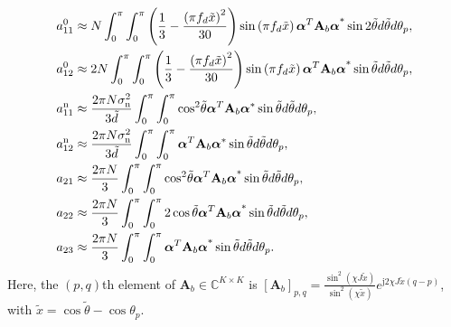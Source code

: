 \documentclass[12pt, draftclsnofoot, onecolumn]{IEEEtran}
\begin{document}
\begin{align}
a_{11}^{0} & \approx N \int_{0}^{ \rm{\pi} }\int_{0}^{ \rm{\pi} }\left( \frac{1}{3}-\frac{{{\left( { \rm{\pi} } {{f}_{d}}\tilde{x} \right)}^{2}}}{30} \right) \sin \left( { \rm{\pi} }{{f}_{d}}\tilde{x} \right){{\boldsymbol{\alpha }}^{T}}{{\mathbf{A}}_{b}}{{\boldsymbol{\alpha }}^{\text{*}}}\sin 2\tilde{\theta }d\tilde{\theta }d{{\theta }_{p}}, \\ \label{a110}
a_{12}^{0} & \approx 2N \int_{0}^{ \rm{\pi} }\int_{0}^{ \rm{\pi} }\left( \frac{1}{3}-\frac{{{\left( { \rm{\pi} } {{f}_{d}}\tilde{x} \right)}^{2}}}{30} \right) \sin \left( { \rm{\pi} }{{f}_{d}}\tilde{x} \right){{\boldsymbol{\alpha }}^{T}}{{\mathbf{A}}_{b}}{{\boldsymbol{\alpha }}^{\text{*}}}\sin \tilde{\theta }d\tilde{\theta }d{{\theta }_{p}}, \\ \label{a120}
a_{11}^{\mathrm{n}} & \approx \frac{2{\rm{\pi}}N \sigma_{\mathrm{n}}^{2}} {3\tilde{d}} \int_{0}^{ \rm{\pi} } {\int_{0}^{ \rm{\pi} } {{{\cos }^{2}}\tilde{\theta } {{\boldsymbol{\alpha }}^{T}} {{\mathbf{A}}_{b}}{{\boldsymbol{\alpha }}^{*}}\sin \tilde{\theta } d\tilde{\theta }}d{{\theta }_{p}}}, \\ \label{a11n}
a_{12}^{\mathrm{n}} & \approx \frac{2{\rm{\pi}}N \sigma_{\mathrm{n}}^{2}}{3\tilde{d}} \int_{0}^{ \rm{\pi} }{\int_{0}^{ \rm{\pi} } {{{\boldsymbol{\alpha }}^{T}}{{\mathbf{A}}_{b}} {{\boldsymbol{\alpha }}^{*}}\sin \tilde{\theta } d\tilde{\theta }}d{{\theta }_{p}}}, \\ \label{a12n} %
{{a}_{21}} & \approx \frac{2{\rm{\pi}}N}{3} \int_{0}^{ \rm{\pi} } {\int_{0}^{ \rm{\pi} }{{{\cos }^{2}} \tilde{\theta }{{\boldsymbol{\alpha }}^{T}} {{\mathbf{A}}_{b}} {{\boldsymbol{\alpha }}^{\text{*}}}\sin \tilde{\theta }d\tilde{\theta }} d{{\theta }_{p}}}, \\ \label{a21}
{{a}_{22}}& \approx \frac{2{\rm{\pi}}N}{3} \int_{0}^{ \rm{\pi} } \int_{0}^{ \rm{\pi} }{2\cos \tilde{\theta } {{\boldsymbol{\alpha }}^{T}} {{\mathbf{A}}_{b}} {{\boldsymbol{\alpha }}^{\text{*}}}\sin \tilde{\theta }d\tilde{\theta }} d{{\theta }_{p}}, \\ \label{a22}
{{a}_{23}} & \approx \frac{2{\rm{\pi}}N}{3} \int_{0}^{ \rm{\pi} } \int_{0}^{ \rm{\pi} }{{{\boldsymbol{\alpha }}^{T}} {{\mathbf{A}}_{b}} {{\boldsymbol{\alpha }}^{\text{*}}}\sin \tilde{\theta }d\tilde{\theta }} d{{\theta }_{p}}. %
\end{align}
Here, the $(p,q)$th element of ${\mathbf{A}}_{b} \in \mathbb{C}^{K\times K}$ is $[{\mathbf{A}}_{b}]_{p,q} \!=\! \frac{{{\sin }^{2}}\left( \chi J\tilde{x} \right)}{{{\sin }^{2}}\left( \chi\tilde{x} \right)} {{e}^{\text{j}2\chi J\tilde{x} \left( q-p \right)}}$, with $\tilde{x} \!=\! \cos \tilde{\theta } \!-\! \cos {{\theta }_{p}}$.
\end{document}
